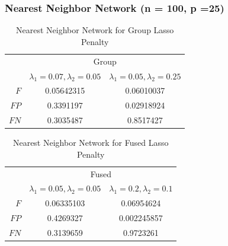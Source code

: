 \documentclass[t]{beamer}
\begin{document}
\begin{frame}
\frametitle{Nearest Neighbor Network (n = 100, p =25)}
\begin{table}
\begin{center}
\begin{tabular}{r|c|c}
\toprule
&\multicolumn{2}{c}{Group}\\
&$\lambda_1 = 0.07,\lambda_2 = 0.05$&$\lambda_1 = 0.05,\lambda_2 = 0.25$\\
\midrule
$F$&0.05642315&0.06010037\\  
$FP$&0.3391197&0.02918924\\   
$FN$&0.3035487&0.8517427\\         
\bottomrule
\end{tabular}
\caption[]{Nearest Neighbor Network for Group Lasso Penalty}
\label{tab:compare1}
\end{center}
\end{table}

\begin{table}
\begin{center}
\begin{tabular}{r|c|c}
\toprule
&\multicolumn{2}{c}{Fused}\\
&$\lambda_1 = 0.05,\lambda_2 = 0.05$&$\lambda_1 = 0.2,\lambda_2 = 0.1$\\
\midrule
$F$&0.06335103&0.06954624\\  
$FP$&0.4269327&0.002245857\\   
$FN$&0.3139659&0.9723261\\         
\bottomrule
\end{tabular}
\caption[]{Nearest Neighbor Network for Fused Lasso Penalty}
\label{tab:compare2}
\end{center}
\end{table}
\end{frame}
\end{document}
